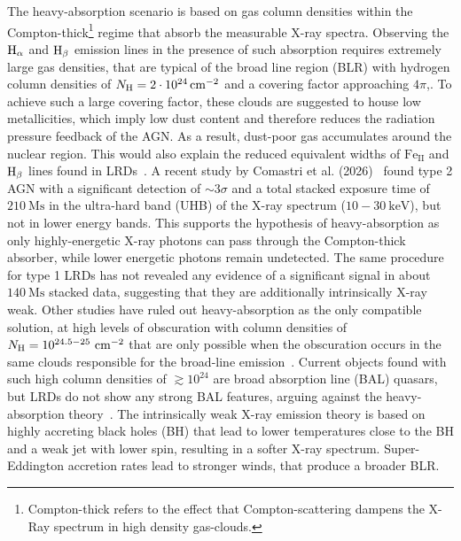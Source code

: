 \noindent
The heavy-absorption scenario is based on gas column densities within the Compton-thick\footnote{Compton-thick refers to the effect that Compton-scattering dampens the X-Ray spectrum in high density gas-clouds.} regime that absorb the measurable X-ray spectra.
Observing the $\text H_\alpha$ and $\text H_\beta$ emission lines in the presence of such absorption requires extremely large gas densities, that are typical of the broad line region (BLR) with hydrogen column densities of $N_{\text H}=\SI{2e24}{\per\centi\meter\squared}$ and a covering factor approaching $4\pi$,\cite{refId0}.
To achieve such a large covering factor, these clouds are suggested to house low metallicities, which imply low dust content and therefore reduces the radiation pressure feedback of the AGN\@.
As a result, dust-poor gas accumulates around the nuclear region\cite{Ishibashi_2025}.
This would also explain the reduced equivalent widths of $\text{Fe}_{\text{II}}$ and $\text H_\beta$ lines found in LRDs~\cite{Ishibashi_2025}.
A recent study by Comastri et al. (2026)~\cite{refId0} found type 2 AGN with a significant detection of $\sim3\sigma$ and a total stacked exposure time of $\SI{210}{\mega\second}$ in the ultra-hard band (UHB) of the X-ray spectrum ($10-30\ \text{keV}$), but not in lower energy bands.
This supports the hypothesis of heavy-absorption as only highly-energetic X-ray photons can pass through the Compton-thick absorber, while lower energetic photons remain undetected.
The same procedure for type 1 LRDs has not revealed any evidence of a significant signal in about $\SI{140}{\mega\second}$ stacked data, suggesting that they are additionally intrinsically X-ray weak.
Other studies have ruled out heavy-absorption as the only compatible solution, at high levels of obscuration with column densities of $N_{\text H} = 10^{24.5-25}\ \si{\per\centi\meter\squared}$\cite{Sacchi_2025} that are only possible when the obscuration occurs in the same clouds responsible for the broad-line emission~\cite{Maiolini_2025}.
Current objects found with such high column densities of $\gtrsim10^{24}$ are broad absorption line (BAL) quasars, but LRDs do not show any strong BAL features, arguing against the heavy-absorption theory~\cite{Yue_2024}. \newline
The intrinsically weak X-ray emission theory is based on highly accreting black holes (BH) that lead to lower temperatures close to the BH and a weak jet with lower spin, resulting in a softer X-ray spectrum.
Super-Eddington accretion rates lead to stronger winds, that produce a broader BLR\@.
